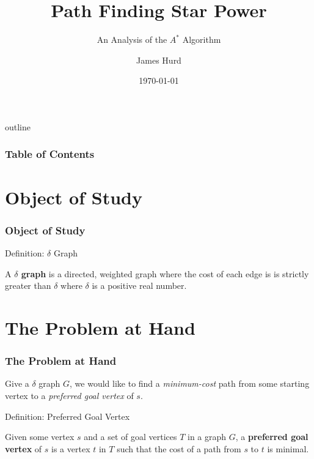 \documentclass{beamer}
\begin{document}

\title{Path Finding Star Power }
\subtitle{An Analysis of the $A^*$ Algorithm}
\author{James Hurd}
\date{\today}



\frame{\titlepage}

\begin{frame}{outline}
  \frametitle{Table of Contents }

\tableofcontents

\end{frame}

\section{Object of Study }
\begin{frame} 
  \frametitle{Object of Study }
  
  \begin{block}{Definition: $\delta$ Graph}

    A \textbf{$\delta$ graph} is a directed, weighted graph where the cost of each edge is is
    strictly greater than $\delta$ where $\delta$ is a positive real number.

  \end{block}

\end{frame}

\section{The Problem at Hand } 
\begin{frame} 
  \frametitle{The Problem at Hand }

  Give a $\delta$ graph $G$, we would like to find a \textit{minimum-cost} path from some starting
  vertex to a \textit{preferred goal vertex} of $s$.

  \begin{block}{Definition: Preferred Goal Vertex}
  
    Given some vertex $s$ and a set of goal vertices $T$ in a graph $G$, 
    a \textbf{preferred goal vertex} of $s$ is a vertex $t$ in $T$ such that
    the cost of a path from $s$ to $t$ is minimal.

  \end{block}

\end{frame}
\end{document}
